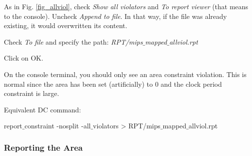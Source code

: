 \begin{enumerate}
{	\item As in Fig. \ref{fig_allviol}, check \textit{Show all violators} and \textit{To report viewer} (that means to the console). Uncheck \textit{Append to file}. In that way, if the file was already existing, it would overwritten its content.
	\item Check \textit{To file} and specify the path: \textit{RPT/mips$\_$mapped$\_$allviol.rpt}
	\item Click on OK.
	\item On the console terminal, you should only see an area constraint violation. This is normal since the area has been set (artificially) to 0 and the clock period constraint is large.
}
\end{enumerate} 

Equivalent DC command:
	\begin{codeline}
report$\_$constraint -nosplit -all$\_$violators > RPT/mips$\_$mapped$\_$allviol.rpt
\end{codeline}






\subsubsection{Reporting the Area}


